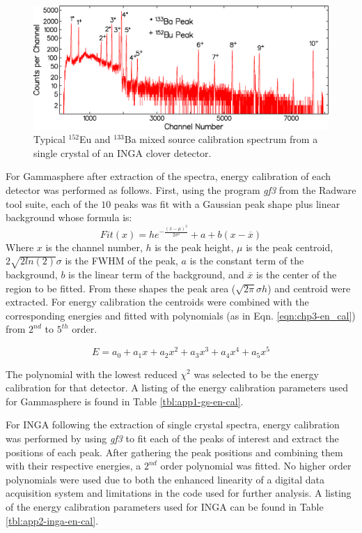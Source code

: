\begin{figure}[h!]
	\centerline{\includegraphics[height=0.25\textheight]{./img/c3/inga_crystal_en_cal.eps}}
	\caption{Typical $^{152}$Eu and $^{133}$Ba mixed source calibration spectrum from a single crystal of an INGA clover detector.}
	\label{fig:chp3-inga-cal-spec}
\end{figure}

For Gammasphere after extraction of the spectra, energy calibration of each detector was performed as follows. First, using the program \emph{gf3} from the Radware tool suite\cite{radware}, each of the $10$ peaks was fit with a Gaussian peak shape plus linear background whose formula is:
\begin{equation}
\label{eqn:chp3-pk_fit} 
Fit(x) = h e^{-\frac{(x-\mu{})^2}{2\sigma{}^2}} + a + b (x-\overline{x})
\end{equation}
Where $x$ is the channel number, $h$ is the peak height, $\mu{}$ is the peak centroid, $2\sqrt{2ln(2)}\sigma{}$ is the FWHM of the peak, $a$ is the constant term of the background, $b$ is the linear term of the background, and $\overline{x}$ is the center of the region to be fitted. From these shapes the peak area ($\sqrt{2\pi{}}\sigma{}h$) and centroid were extracted. For energy calibration the centroids were combined with the corresponding energies and fitted with polynomials (as in Eqn. \ref{eqn:chp3-en_cal}) from $2^{nd}$ to $5^{th}$ order.

\begin{equation}
\label{eqn:chp3-en_cal} 
E = a_0 + a_1x + a_2x^2 + a_3x^3 + a_4x^4 + a_5x^5
\end{equation}

The polynomial with the lowest reduced $\chi{}^2$ was selected to be the energy calibration for that detector. A listing of the energy calibration parameters used for Gammasphere is found in Table \ref{tbl:app1-gs-en-cal}.

For INGA following the extraction of single crystal spectra, energy calibration was performed by using \emph{gf3} to fit each of the peaks of interest and extract the positions of each peak. After gathering the peak positions and combining them with their respective energies, a $2^{nd}$ order polynomial was fitted. No higher order polynomials were used due to both the enhanced linearity of a digital data acquisition system and limitations in the code used for further analysis. A listing of the energy calibration parameters used for INGA can be found in Table \ref{tbl:app2-inga-en-cal}.


